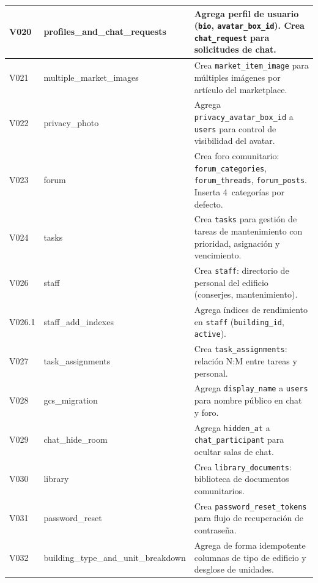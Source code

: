 \begin{longtable}{|p{}|p{}|p{}|}
V020 & profiles\_and\_chat\_requests & Agrega perfil de usuario (\texttt{bio}, \texttt{avatar\_box\_id}). Crea \texttt{chat\_request} para solicitudes de chat. \\ \hline

V021 & multiple\_market\_images & Crea \texttt{market\_item\_image} para múltiples imágenes por artículo del marketplace. \\ \hline

V022 & privacy\_photo & Agrega \texttt{privacy\_avatar\_box\_id} a \texttt{users} para control de visibilidad del avatar. \\ \hline

V023 & forum & Crea foro comunitario: \texttt{forum\_categories}, \texttt{forum\_threads}, \texttt{forum\_posts}. Inserta 4~categorías por defecto. \\ \hline

V024 & tasks & Crea \texttt{tasks} para gestión de tareas de mantenimiento con prioridad, asignación y vencimiento. \\ \hline

V026 & staff & Crea \texttt{staff}: directorio de personal del edificio (conserjes, mantenimiento). \\ \hline

V026.1 & staff\_add\_indexes & Agrega índices de rendimiento en \texttt{staff} (\texttt{building\_id}, \texttt{active}). \\ \hline

V027 & task\_assignments & Crea \texttt{task\_assignments}: relación N:M entre tareas y personal. \\ \hline

V028 & gcs\_migration & Agrega \texttt{display\_name} a \texttt{users} para nombre público en chat y foro. \\ \hline

V029 & chat\_hide\_room & Agrega \texttt{hidden\_at} a \texttt{chat\_participant} para ocultar salas de chat. \\ \hline

V030 & library & Crea \texttt{library\_documents}: biblioteca de documentos comunitarios. \\ \hline

V031 & password\_reset & Crea \texttt{password\_reset\_tokens} para flujo de recuperación de contraseña. \\ \hline

V032 & building\_type\_and\_unit\_breakdown & Agrega de forma idempotente columnas de tipo de edificio y desglose de unidades. \\ \hline


\end{longtable}
